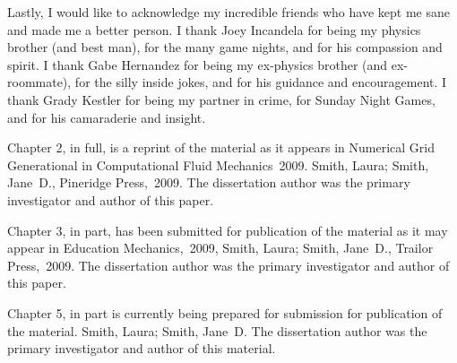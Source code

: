 \begin{acknowledgements}
Lastly, I would like to acknowledge my incredible friends who have kept me sane and made me a better person. 
I thank Joey Incandela for being my physics brother (and best man), for the many game nights, and for his compassion and spirit. 
I thank Gabe Hernandez for being my ex-physics brother (and ex-roommate), for the silly inside jokes, and for his guidance and encouragement. 
I thank Grady Kestler for being my partner in crime, for Sunday Night Games, and for his camaraderie and insight. 

Chapter 2, in full, is a reprint of the material as it appears in
Numerical Grid Generational in Computational Fluid Mechanics~2009.
Smith, Laura; Smith, Jane~D., Pineridge Press,~2009. The dissertation
author was the primary investigator and author of this paper.

Chapter 3, in part, has been submitted for publication of the material
as it may appear in Education Mechanics,~2009, Smith, Laura; Smith,
Jane~D., Trailor Press,~2009. The dissertation author was the primary
investigator and author of this paper.

Chapter 5, in part is currently being prepared for submission for
publication of the material. Smith, Laura; Smith, Jane~D\@. The
dissertation author was the primary investigator and author of this
material.
\end{acknowledgements}
